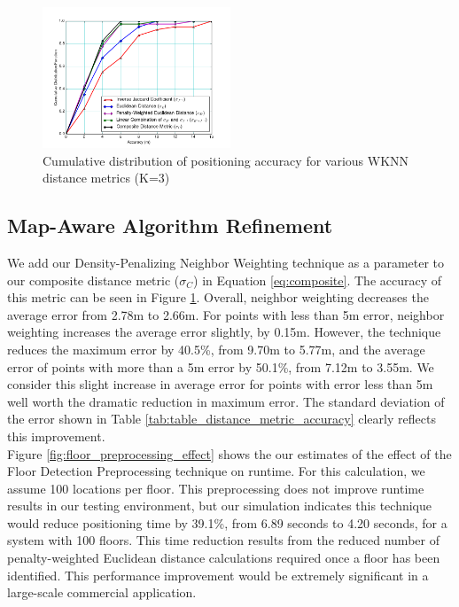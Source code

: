 \documentclass[conference]{IEEEtran}
\begin{document}
\begin{figure}[t!]
  \centering
    \includegraphics[width=0.5\textwidth]{distance_comparison.png}
    \caption{Cumulative distribution of positioning accuracy for various WKNN distance metrics (K=3)}
    \label{fig:cdf_positioning_accuracy}
\end{figure}


\subsection{Map-Aware Algorithm Refinement}

We add our Density-Penalizing Neighbor Weighting technique as a parameter to our composite distance metric ($\sigma_C$) in Equation \ref{eq:composite}. The accuracy of this metric can be seen in Figure \ref{fig:cdf_positioning_accuracy}. Overall, neighbor weighting decreases the average error from 2.78m to 2.66m. For points with less than 5m error, neighbor weighting increases the average error slightly, by 0.15m. However, the technique reduces the maximum error by 40.5\%, from 9.70m to 5.77m, and the average error of points with more than a 5m error by 50.1\%, from 7.12m to 3.55m. We consider this slight increase in average error for points with error less than 5m well worth the dramatic reduction in maximum error. The standard deviation of the error shown in Table \ref{tab:table_distance_metric_accuracy} clearly reflects this improvement.\\	
\indent Figure \ref{fig:floor_preprocessing_effect} shows the our estimates of the effect of the Floor Detection Preprocessing technique on runtime. For this calculation, we assume 100 locations per floor. This preprocessing does not improve runtime results in our testing environment, but our simulation indicates this technique would reduce positioning time by 39.1\%, from 6.89 seconds to 4.20 seconds, for a system with 100 floors. This time reduction results from the reduced number of penalty-weighted Euclidean distance calculations required once a floor has been identified. This performance improvement would be extremely significant in a large-scale commercial application.
\end{document}
